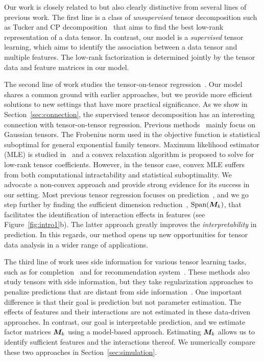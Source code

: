 \documentclass[12pt]{article}
\theoremstyle{definition}
\theoremstyle{definition}
\begin{document}
Our work is closely related to but also clearly distinctive from several lines of previous work. The first line is a class of \textit{unsupervised} tensor decomposition such as Tucker and CP decomposition~\citep{de2000multilinear, kolda2009tensor, hong2020generalized,wang2017tensor,bi2018recom,chi2012tensors} that aims to find the best low-rank representation of a data tensor. In contrast, our model is a \textit{supervised} tensor learning, which aims to identify the association between a data tensor and multiple features. The low-rank factorization is determined jointly by the tensor data and feature matrices in our model.

The second line of work studies the tensor-on-tensor regression~\citep{raskutti2019convex, lock2018tensor,gahrooei2020multiple}. Our model shares a common ground with earlier approaches, but we provide more efficient solutions to new settings that have more practical significance. As we show in Section~\ref{sec:connection}, the supervised tensor decomposition has an interesting connection with tensor-on-tensor regression. Previous methods~\citep{lock2018tensor,lock2018supervised} mainly focus on Gaussian tensors. The Frobenius norm used in the objective function is statistical suboptimal for general exponential family tensors. Maximum likelihood estimator (MLE) is studied in~\cite{raskutti2019convex} and a convex relaxation algorithm is proposed to solve for low-rank tensor coefficients. However, in the tensor case, convex MLE suffers from both computational intractability and statistical suboptimality. We advocate a non-convex approach and provide strong evidence for its success in our setting. Most previous tensor regression focuses on prediction~\citep{lock2018tensor,raskutti2019convex}, and we go step further by finding the sufficient dimension reduction~\citep{adragni2009sufficient}, $\textup{Span}(\bm M_k)$, that facilitates the identification of interaction effects in features (see Figure~\ref{fig:intro1}b). The latter approach greatly improves the \emph{interpretability} in prediction. In this regards, our method opens up new opportunities for tensor data analysis in a wider range of applications. 

The third line of work uses side information for various tensor learning tasks, such as for completion~\citep{narita2012tensor,song2019tensor,cao2016semi} and for recommendation system~\citep{ioannidis2019coupled,farias2019learning}. These methods also study tensors with side information, but they take regularization approaches to penalize predictions that are distant from side information~\citep{cao2016semi,song2019tensor}. One important difference is that their goal is prediction but not parameter estimation. The effects of features and their interactions are not estimated in these data-driven approaches. In contrast, our goal is interpretable prediction, and we estimate factor matrices $\bm M_k$ using a model-based approach. Estimating $\bm M_k$ allows us to identify sufficient features and the interactions thereof. We numerically compare these two approaches in Section~\ref{sec:simulation}.
\end{document}
